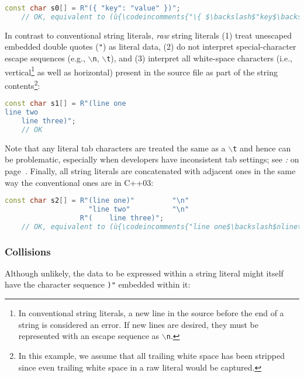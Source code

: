 \begin{lstlisting}[language=C++]
const char s0[] = R"({ "key": "value" })";
    // OK, equivalent to (ù{\codeincomments{"\{ $\backslash$"key$\backslash$": $\backslash$"value$\backslash$" \}"}}ù)
\end{lstlisting}
    
\noindent In contrast to conventional string literals, \emph{raw} string literals
(1) treat unescaped embedded double quotes (\texttt{"}) as literal data,
(2) do not interpret special-character escape sequences (e.g.,
\texttt{$\backslash$n}, \texttt{$\backslash$t}), and (3) interpret all
white-space characters (i.e., vertical\footnote{In conventional string literals, a
new line in the source before the end of a string is considered an error.
If new lines are desired, they must be represented with an escape
sequence as \texttt{$\backslash$n}.} as well as horizontal) present in
the source file as part of the string contents{\cprotect\footnote{In
this example, we assume that all trailing white space has been stripped
since even trailing white space in a raw literal would be captured.}}:


\begin{lstlisting}[language=C++]
const char s1[] = R"(line one
line two
    line three)";
    // OK
\end{lstlisting}
    
\noindent Note that any literal tab characters are treated the same as a
\texttt{$\backslash$t} and hence can be problematic, especially when
developers have inconsistent tab settings; see \textit{: } on page~\pageref{unexpected-indentation}. Finally, all string literals are concatenated with
adjacent ones in the same way the conventional ones are in C++03:

\begin{lstlisting}[language=C++]
const char s2[] = R"(line one)"         "\n"
                    "line two"          "\n"
                  R"(    line three)";
    // OK, equivalent to (ù{\codeincomments{"line one$\backslash$nlinetwo$\backslash$n~~~~line three"}}ù)    
\end{lstlisting}


\subsubsection[Collisions]{Collisions}\label{collisions}

Although unlikely, the data to be expressed within a
string literal might itself have the character sequence \texttt{)"}
embedded within it:

